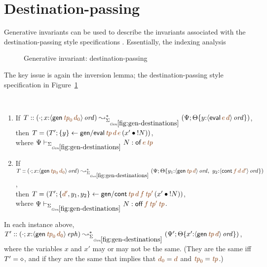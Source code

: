 
\section{Destination-passing}
\label{sec:gen-destinations}

Generative invariants can be used to describe the invariants 
associated with the destination-passing style specifications . Essentially,
the indexing analysis 

\begin{figure}[tp]
\caption{Generative invariant: destination-passing}
\label{fig:gen-destinations} 
\end{figure}

The key issue is again the inversion lemma; the destination-passing
style specification in Figure~\ref{fig:gen-destinations}

\bigskip
\begin{lemma}~
\label{lemma:inversion-destinations}
\begin{enumerate}
\item If 
   $T :: (\cdot; x{:}\istrue{\susp{{\sf gen}\,\lf{{\it tp}_0}\,\lf{d_0}}})
         \leadsto^*_{\siggendests}
         (\Psi; \tackon{\Theta}
            {y{:}\istrue{\susp{{\sf eval}\,\lf{e}\,\lf{d}}}})$,
\\ then 
   $T = \left(T'; \trstep{y}{{\sf gen/eval}\,\lf{\it tp}\,\lf{d}\,\lf{e}\,
                                  (\tfuser{x'}{\tbangr{N}})}\right)$,
\\ where
   $\Psi \vdash_{\siggendests} N : {{\sf of}\,\lf{e}\,\lf{\it tp}}$ 
\medskip
\item If 
   $T :: (\cdot; x{:}\istrue{\susp{{\sf gen}\,\lf{{\it tp}_0}\,\lf{d_0}}})
         \leadsto^*_{\siggendests}
         (\Psi; \tackon{\Theta}
            {y_1{:}\istrue{\susp{{\sf gen}\,\lf{{\it tp}}\,\lf{d}}}, ~
             y_2{:}\istrue{\susp{{\sf cont}\,\lf{f}\,\lf{d}\,\lf{d'}}}})$,
\\ then 
   $T = \left(T'; \trstep{\lf{d'},y_1,y_2}
              {{\sf gen/cont}\,\lf{\it tp}\,\lf{d}\,\lf{f}\,\lf{{\it tp}'}\,
                (\tfuser{x'}{\tbangr{N}})}\right)$,
\\ where 
   $\Psi \vdash_{\siggendests} N : 
       {{{\sf off}\,\lf{f}\,\lf{{\it tp}'}\,\lf{{\it tp}}}}$.
\medskip
\end{enumerate}
In each instance above, 
$T' :: (\cdot; x{:}\iseph{\susp{{\sf gen}\,\lf{{\it tp}_0}\,\lf{d_0}}})
       \leadsto^*_{\siggendests}
       (\Psi'; \tackon{\Theta}
          {x'{:}\istrue{\susp{{\sf gen}\,\lf{\it tp}\,\lf{d}}}})$,
%
where the variables $x$ and $x'$ may or may not
be the same. (They are the same iff $T' = \diamond$, and if they
are the same that implies that 
$\lf{d_0} = \lf{d}$ and $\lf{{\it tp}_0} = \lf{\it tp}$.)
\end{lemma}

